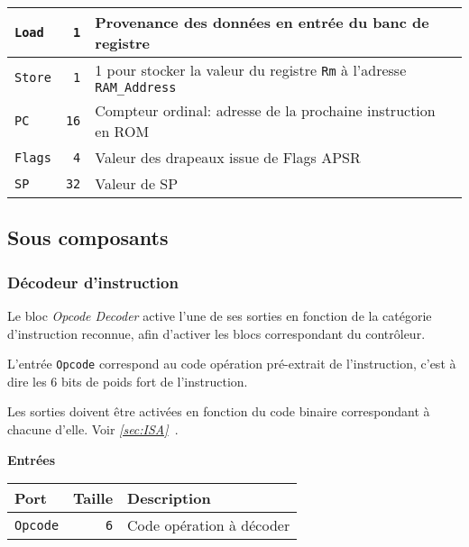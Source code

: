 \documentclass{article}
\begin{document}
\begin{tabular}{|l|r|l|}
        \hline
        \texttt{Load}          & \texttt{1}      & Provenance des données en entrée du banc de registre                                               \\
        \hline
        \texttt{Store}         & \texttt{1}      & 1 pour stocker la valeur du registre \texttt{Rm} à l'adresse \texttt{RAM\_Address}                  \\
        \hline
        \texttt{PC}            & \texttt{16}      & Compteur ordinal: adresse de la prochaine instruction en ROM                                       \\
        \hline
        \texttt{Flags}         & \texttt{4}      & Valeur des drapeaux issue de Flags APSR                \\
        \hline
        
        \texttt{SP}            & \texttt{32}     & Valeur de SP                                                                                       \\
        \hline
    \end{tabular}

    \subsection{Sous composants}

    \subsubsection{Décodeur d'instruction}
    \label{sec:OpDec}


    Le bloc \textit{Opcode Decoder} active l'une de ses sorties en fonction de la catégorie d'instruction reconnue, afin d'activer les blocs correspondant du contrôleur.

    L'entrée \texttt{Opcode} correspond au code opération pré-extrait de l'instruction, c'est à dire les 6 bits de poids fort de l'instruction.

    Les sorties doivent être activées en fonction du code binaire correspondant à chacune d'elle.
    Voir \textit{\ref{sec:ISA}~}.


    \textbf{Entrées}\\

    \begin{tabular}{|l|r|l|}
        \hline
        \textbf{Port}   & \textbf{Taille} & \textbf{Description}     \\
        \hline

        \texttt{Opcode} & \texttt{6}      & Code opération à décoder \\

        \hline
    \end{tabular}
\end{document}
